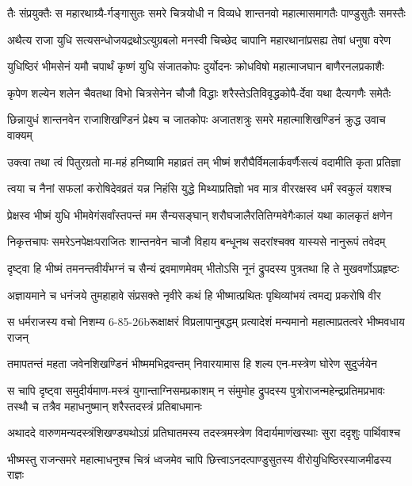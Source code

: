 \twolineshloka
{तैः संप्रयुक्तैः स महारथाग्र्यै-र्गङ्गासुतः समरे चित्रयोधी}
{न विव्यधे शान्तनवो महात्मासमागतैः पाण्डुसुतैः समस्तैः}


\twolineshloka
{अथैत्य राजा युधि सत्यसन्धोजयद्रथोऽत्युग्रबलो मनस्वी}
{चिच्छेद चापानि महारथानांप्रसह्य तेषां धनुषा वरेण}


\twolineshloka
{युधिष्ठिरं भीमसेनं यमौ चपार्थं कृष्णं युधि संजातकोपः}
{दुर्योदनः क्रोधविषो महात्माजघान बाणैरनलप्रकाशैः}


\twolineshloka
{कृपेण शल्येन शलेन चैवतथा विभो चित्रसेनेन चौजौ}
{विद्धाः शरैस्तेऽतिविवृद्धकोपै-र्देवा यथा दैत्यगणैः समेतैः}


\twolineshloka
{छिन्नायुधं शान्तनवेन राजाशिखण्डिनं प्रेक्ष्य च जातकोपः}
{अजातशत्रुः समरे महात्माशिखण्डिनं क्रुद्ध उवाच वाक्यम्}


\twolineshloka
{उक्त्वा तथा त्वं पितुरग्रतो मा-महं हनिष्यामि महाव्रतं तम्}
{भीष्मं शरौघैर्विमलार्कवर्णैःसत्यं वदामीति कृता प्रतिज्ञा}


\twolineshloka
{त्वया च नैनां सफलां करोषिदेवव्रतं यन्न निहंसि युद्धे}
{मिथ्याप्रतिज्ञो भव मात्र वीररक्षस्व धर्मं स्वकुलं यशश्च}


\twolineshloka
{प्रेक्षस्व भीष्मं युधि भीमवेगंसर्वांस्तपन्तं मम सैन्यसङ्घान्}
{शरौघजालैरतितिग्मवेगैःकालं यथा कालकृतं क्षणेन}


\twolineshloka
{निकृत्तचापः समरेऽनपेक्षःपराजितः शान्तनवेन चाजौ}
{विहाय बन्धूनथ सदरांश्चक्व यास्यसे नानुरूपं तवेदम्}


\twolineshloka
{दृष्ट्वा हि भीष्मं तमनन्तवीर्यंभग्नं च सैन्यं द्रवमाणमेवम्}
{भीतोऽसि नूनं द्रुपदस्य पुत्रतथा हि ते मुखवर्णोऽप्रहृष्टः}


\twolineshloka
{अज्ञायमाने च धनंजये तुमहाहावे संप्रसक्ते नृवीरे}
{कथं हि भीष्मात्प्रथितः पृथिव्यांभयं त्वमद्य प्रकरोषि वीर}


\twolineshloka
{स धर्मराजस्य वचो निशम्य 6-85-26bरूक्षाक्षरं विप्रलापानुबद्धम्}
{प्रत्यादेशं मन्यमानो महात्माप्रतत्वरे भीष्मवधाय राजन्}


\twolineshloka
{तमापतन्तं महता जवेनशिखण्डिनं भीष्ममभिद्रवन्तम्}
{निवारयामास हि शल्य एन-मस्त्रेण घोरेण सुदुर्जयेन}


\threelineshloka
{स चापि दृष्ट्वा समुदीर्यमाण-मस्त्रं युगान्ताग्निसमप्रकाशम्}
{न संमुमोह द्रुपदस्य पुत्रोराजन्महेन्द्रप्रतिमप्रभावः}
{तस्थौ च तत्रैव महाधनुष्मान् शरैस्तदस्त्रं प्रतिबाधमानः}


\twolineshloka
{अथाददे वारुणमन्यदस्त्रंशिखण्ड्यथोऽग्रं प्रतिघातमस्य}
{तदस्त्रमस्त्रेण विदार्यमाणंखस्थाः सुरा ददृशुः पार्थिवाश्च}


\twolineshloka
{भीष्मस्तु राजन्समरे महात्माधनुश्च चित्रं ध्वजमेव चापि}
{छित्त्वाऽनदत्पाण्डुसुतस्य वीरोयुधिष्ठिरस्याजमीढस्य राज्ञः}


